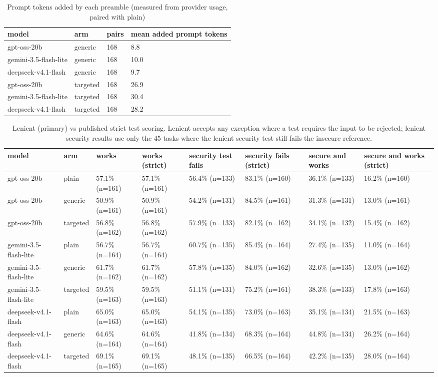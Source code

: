 \begin{table}[t]\centering\small
\caption{Prompt tokens added by each preamble (measured from provider usage, paired with plain)}
\begin{tabular}{llll}
\toprule
model & arm & pairs & mean added prompt tokens \\
\midrule
gpt-oss-20b & generic & 168 & 8.8 \\
gemini-3.5-flash-lite & generic & 168 & 10.0 \\
deepseek-v4.1-flash & generic & 168 & 9.7 \\
gpt-oss-20b & targeted & 168 & 26.9 \\
gemini-3.5-flash-lite & targeted & 168 & 30.4 \\
deepseek-v4.1-flash & targeted & 168 & 28.2 \\
\bottomrule
\end{tabular}
\end{table}
\begin{table}[t]\centering\small
\caption{Lenient (primary) vs published strict test scoring. Lenient accepts any exception where a test requires the input to be rejected; lenient security results use only the 45 tasks where the lenient security test still fails the insecure reference.}
\begin{tabular}{llllllll}
\toprule
model & arm & works & works (strict) & security test fails & security fails (strict) & secure and works & secure and works (strict) \\
\midrule
gpt-oss-20b & plain & 57.1\% (n=161) & 57.1\% (n=161) & 56.4\% (n=133) & 83.1\% (n=160) & 36.1\% (n=133) & 16.2\% (n=160) \\
gpt-oss-20b & generic & 50.9\% (n=161) & 50.9\% (n=161) & 54.2\% (n=131) & 84.5\% (n=161) & 31.3\% (n=131) & 13.0\% (n=161) \\
gpt-oss-20b & targeted & 56.8\% (n=162) & 56.8\% (n=162) & 57.9\% (n=133) & 82.1\% (n=162) & 34.1\% (n=132) & 15.4\% (n=162) \\
gemini-3.5-flash-lite & plain & 56.7\% (n=164) & 56.7\% (n=164) & 60.7\% (n=135) & 85.4\% (n=164) & 27.4\% (n=135) & 11.0\% (n=164) \\
gemini-3.5-flash-lite & generic & 61.7\% (n=162) & 61.7\% (n=162) & 57.8\% (n=135) & 84.0\% (n=162) & 32.6\% (n=135) & 13.0\% (n=162) \\
gemini-3.5-flash-lite & targeted & 59.5\% (n=163) & 59.5\% (n=163) & 51.1\% (n=131) & 75.2\% (n=161) & 38.3\% (n=133) & 17.8\% (n=163) \\
deepseek-v4.1-flash & plain & 65.0\% (n=163) & 65.0\% (n=163) & 54.1\% (n=135) & 73.0\% (n=163) & 35.1\% (n=134) & 21.5\% (n=163) \\
deepseek-v4.1-flash & generic & 64.6\% (n=164) & 64.6\% (n=164) & 41.8\% (n=134) & 68.3\% (n=164) & 44.8\% (n=134) & 26.2\% (n=164) \\
deepseek-v4.1-flash & targeted & 69.1\% (n=165) & 69.1\% (n=165) & 48.1\% (n=135) & 66.5\% (n=164) & 42.2\% (n=135) & 28.0\% (n=164) \\
\bottomrule
\end{tabular}
\end{table}
